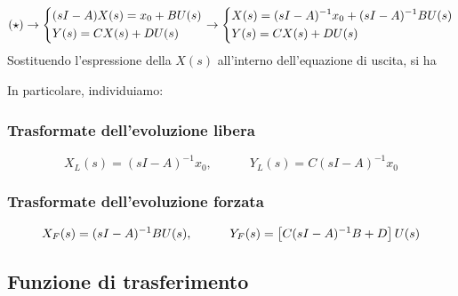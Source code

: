 \begin{equation*}
(\star) \rightarrow
\begin{dcases}
(sI-A)X(s) = x_0 + BU(s) \\
Y(s) = CX(s) + DU(s) 
\end{dcases} \rightarrow \begin{dcases}
X(s) = (sI-A)^{-1}x_0 + (sI-A)^{-1}BU(s) \\
Y(s) = CX(s) + DU(s) 
\end{dcases}
\end{equation*}
Sostituendo l'espressione della $X(s)$ all'interno dell'equazione di uscita, si ha
\begin{center}
\end{center}
\newpage
In particolare, individuiamo:
\subsubsection{Trasformate dell'evoluzione libera}
\begin{equation}
X_L(s) = (sI-A)^{-1}x_0, \quad \quad \quad Y_L(s) = C(sI-A)^{-1}x_0
\end{equation}
\subsubsection{Trasformate dell'evoluzione forzata}
\begin{equation}
X_F(s) = (sI-A)^{-1} BU(s), \quad \quad \quad Y_F(s) = \left[ C(sI-A)^{-1}B + D \right]U(s)
\end{equation}

\subsection{Funzione di trasferimento}

















